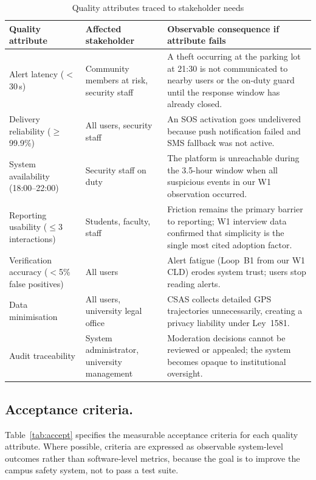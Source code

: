 \documentclass[12pt,a4paper]{article}
\begin{document}
\begin{table}[h]
\caption{Quality attributes traced to stakeholder needs}
\label{tab:qatrace}
\centering
\begin{tabularx}{\textwidth}{lXX}
\toprule
\textbf{Quality attribute} & \textbf{Affected stakeholder} & \textbf{Observable consequence if attribute fails} \\
\midrule
Alert latency ($<$30\,s) & Community members at risk, security staff & A theft occurring at the parking lot at 21:30 is not communicated to nearby users or the on-duty guard until the response window has already closed. \\
Delivery reliability ($\geq$99.9\%) & All users, security staff & An SOS activation goes undelivered because push notification failed and SMS fallback was not active. \\
System availability (18:00--22:00) & Security staff on duty & The platform is unreachable during the 3.5-hour window when all suspicious events in our W1 observation occurred. \\
Reporting usability ($\leq$3 interactions) & Students, faculty, staff & Friction remains the primary barrier to reporting; W1 interview data confirmed that simplicity is the single most cited adoption factor. \\
Verification accuracy ($<$5\% false positives) & All users & Alert fatigue (Loop~B1 from our W1 CLD) erodes system trust; users stop reading alerts. \\
Data minimisation & All users, university legal office & CSAS collects detailed GPS trajectories unnecessarily, creating a privacy liability under Ley~1581. \\
Audit traceability & System administrator, university management & Moderation decisions cannot be reviewed or appealed; the system becomes opaque to institutional oversight. \\
\bottomrule
\end{tabularx}
\end{table}

\subsection{Acceptance criteria.}
Table~\ref{tab:accept} specifies the measurable acceptance criteria
for each quality attribute. Where possible, criteria are expressed
as observable system-level outcomes rather than software-level
metrics, because the goal is to improve the campus safety system,
not to pass a test suite.
\end{document}
